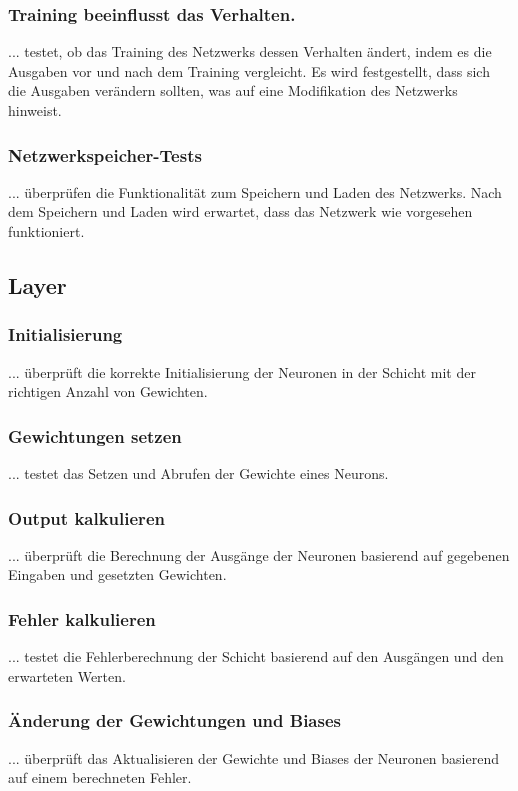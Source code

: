 \subsubsection{Training beeinflusst das Verhalten.}
\label{sec:DesignTrainingBeeinflusstDasVerhalten}
... testet, ob das Training des Netzwerks dessen Verhalten ändert, indem es die Ausgaben vor und nach dem Training vergleicht. Es wird festgestellt, dass sich die Ausgaben verändern sollten, was auf eine Modifikation des Netzwerks hinweist.
\subsubsection{Netzwerkspeicher-Tests}
\label{sec:DesignNetzwerkspeicher}
... überprüfen die Funktionalität zum Speichern und Laden des Netzwerks. Nach dem Speichern und Laden wird erwartet, dass das Netzwerk wie vorgesehen funktioniert.

\subsection{Layer}
\label{sec:DesignLayer}
\subsubsection{Initialisierung}
\label{sec:DesignInitialisierung}
... überprüft die korrekte Initialisierung der Neuronen in der Schicht mit der richtigen Anzahl von Gewichten.
\subsubsection{Gewichtungen setzen}
\label{sec:DesignGewichtungenSetzen}
... testet das Setzen und Abrufen der Gewichte eines Neurons.
\subsubsection{Output kalkulieren}
\label{sec:DesignOutputKalkulieren}
... überprüft die Berechnung der Ausgänge der Neuronen basierend auf gegebenen Eingaben und gesetzten Gewichten.
\subsubsection{Fehler kalkulieren}
\label{sec:DesignFehlerKalkulieren}
... testet die Fehlerberechnung der Schicht basierend auf den Ausgängen und den erwarteten Werten.
\subsubsection{Änderung der Gewichtungen und Biases}
\label{sec:DesignÄnderungDerGewichtungenUndBiases}
... überprüft das Aktualisieren der Gewichte und Biases der Neuronen basierend auf einem berechneten Fehler.

